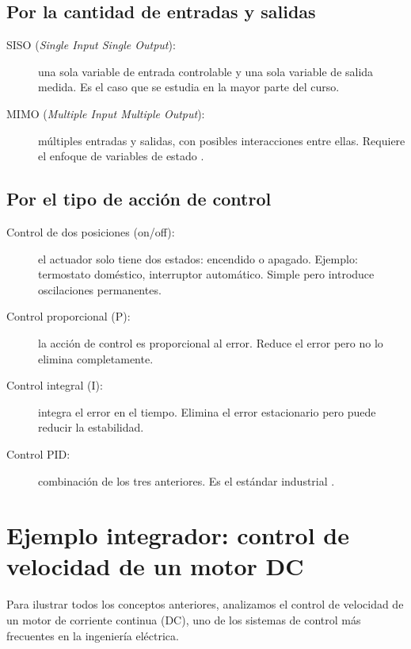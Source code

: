 \subsection{Por la cantidad de entradas y salidas}

\begin{description}
  \item[SISO (\textit{Single Input Single Output}):] una sola variable de
    entrada controlable y una sola variable de salida medida. Es el caso
    que se estudia en la mayor parte del curso.
  \item[MIMO (\textit{Multiple Input Multiple Output}):] múltiples entradas
    y salidas, con posibles interacciones entre ellas. Requiere el enfoque
    de variables de estado .
\end{description}

\subsection{Por el tipo de acción de control}

\begin{description}
  \item[Control de dos posiciones (on/off):] el actuador solo tiene dos
    estados: encendido o apagado. Ejemplo: termostato doméstico, interruptor
    automático. Simple pero introduce oscilaciones permanentes.
  \item[Control proporcional (P):] la acción de control es proporcional
    al error. Reduce el error pero no lo elimina completamente.
  \item[Control integral (I):] integra el error en el tiempo. Elimina el
    error estacionario pero puede reducir la estabilidad.
  \item[Control PID:] combinación de los tres anteriores. Es el estándar
    industrial .
\end{description}

\section{Ejemplo integrador: control de velocidad de un motor DC}
\label{sec:intro-ejemplo-motor}

Para ilustrar todos los conceptos anteriores, analizamos el control de
velocidad de un motor de corriente continua (DC), uno de los sistemas
de control más frecuentes en la ingeniería eléctrica.

